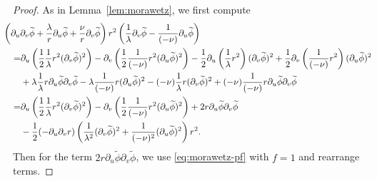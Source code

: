 \documentclass[10pt, reqno]{amsart}
\theoremstyle{definition}
\theoremstyle{remark}
\theoremstyle{conjecture}
\numberwithin{equation}{section}
\newcommand{\rd}{\partial}
\newcommand{\0}{\emptyset}
\newcommand{\lmb}{\lambda}
\newcommand{\dur}{\nu}
\newcommand{\dvr}{\lmb}
\newcommand{\phibg}{\overline{\phi}}				%
\newcommand{\phidf}{\widetilde{\phi}}				%
\begin{document}
\begin{proof}
As in Lemma~\ref{lem:morawetz}, we first compute
\begin{align*}
& \hskip-2em
	\left(\rd_{u} \rd_{v} \phidf + \frac{\dvr}{r} \rd_{u} \phidf + \frac{\dur}{r} \rd_{v} \phidf \right) r^{2} \left( \frac{1}{\dvr} \rd_{v} \phidf - \frac{1}{(-\dur)} \rd_{u} \phidf \right) \\
	= & \rd_{u} \left( \frac{1}{2} \frac{1}{\dvr} r^{2} (\rd_{v} \phidf)^{2}\right) 
		- \rd_{v} \left( \frac{1}{2} \frac{1}{(-\dur)} r^{2} (\rd_{u} \phidf)^{2} \right) 
	 - \frac{1}{2} \rd_{u} \left( \frac{1}{\dvr} r^{2} \right) (\rd_{v} \phidf)^{2} 
	+ \frac{1}{2} \rd_{v} \left( \frac{1}{(-\dur)} r^{2} \right) (\rd_{u} \phidf)^{2} \\
	& + \dvr \frac{1}{\dvr} r \rd_{u} \phidf \rd_{v} \phidf - \dvr \frac{1}{(-\dur)} r (\rd_{u} \phidf)^{2} 
	 - (-\dur) \frac{1}{\dvr} r (\rd_{v} \phidf)^{2} + (-\dur) \frac{1}{(-\dur)} r \rd_{u} \phidf \rd_{v} \phidf \\
	= & \rd_{u} \left( \frac{1}{2} \frac{1}{\dvr} r^{2} (\rd_{v} \phidf)^{2}\right) 
		- \rd_{v} \left( \frac{1}{2} \frac{1}{(-\dur)} r^{2} (\rd_{u} \phidf)^{2} \right) 
		+ 2 r \rd_{u} \phidf \rd_{v} \phidf \\
	& - \frac{1}{2} (-\rd_{u} \rd_{v} r) \left( \frac{1}{\dvr^{2}} (\rd_{v} \phidf)^{2} + \frac{1}{(-\dur)^{2}} (\rd_{u} \phidf)^{2} \right) r^{2} .
\end{align*}
Then for the term $2 r \rd_{u} \phidf \rd_{v} \phidf$, we use \eqref{eq:morawetz-pf} with $f = 1$ and rearrange terms. \qedhere
\end{proof}
\end{document}

